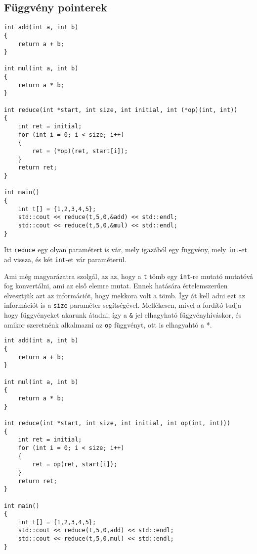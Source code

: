 \documentclass[a4paper,11.5pt]{article}
\begin{document}
	\subsection{Függvény pointerek}
	\begin{example}
		\begin{lstlisting}
int add(int a, int b)
{
	return a + b;
}

int mul(int a, int b)
{
	return a * b;
}

int reduce(int *start, int size, int initial, int (*op)(int, int))
{
	int ret = initial;
	for (int i = 0; i < size; i++)
	{
		ret = (*op)(ret, start[i]);
	}
	return ret;
}

int main()
{
	int t[] = {1,2,3,4,5};
	std::cout << reduce(t,5,0,&add) << std::endl;
	std::cout << reduce(t,5,0,&mul) << std::endl;
}
		\end{lstlisting}
		
		Itt \texttt{reduce} egy olyan paramétert is vár, mely igazából egy függvény, mely \texttt{int}-et ad vissza, és két \texttt{int}-et vár paraméterül.
		\medskip
		
		Ami még magyarázatra szolgál, az az, hogy a \texttt{t} tömb egy \texttt{int}-re mutató mutatóvá fog konvertálni, ami az első elemre mutat. Ennek hatására értelemszerűen elvesztjük azt az információt, hogy mekkora volt a tömb. Így át kell adni ezt az információt is a \texttt{size} paraméter segítségével. Mellékesen, mivel a fordító tudja hogy függvényeket akarunk átadni, így a \texttt{\&} jel elhagyható függvényhíváskor, és amikor szeretnénk alkalmazni az \texttt{op} függvényt, ott is elhagyahtó a *.
		\begin{lstlisting}
int add(int a, int b)
{
	return a + b;
}

int mul(int a, int b)
{
	return a * b;
}

int reduce(int *start, int size, int initial, int op(int, int)))
{
	int ret = initial;
	for (int i = 0; i < size; i++)
	{
		ret = op(ret, start[i]);
	}
	return ret;
}

int main()
{
	int t[] = {1,2,3,4,5};
	std::cout << reduce(t,5,0,add) << std::endl;
	std::cout << reduce(t,5,0,mul) << std::endl;
}
		\end{lstlisting}
	\end{example}
\end{document}
